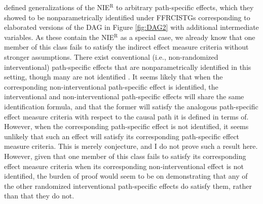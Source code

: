\documentclass[12pt]{article}
\begin{document}
\cite{lin2017interventional} defined generalizations of the NIE$^{\text{R}}$ to arbitrary path-specific effects, which they showed to be nonparametrically identified under FFRCISTGs corresponding to elaborated versions of the DAG in Figure \ref{fig:DAG2} %
with additional intermediate variables. As these contain the NIE$^{\text{R}}$ as a special case, we already know that one member of this class fails to satisfy the indirect effect measure criteria without stronger assumptions. There exist conventional (i.e., non-randomized interventional) path-specific effects that are nonparametrically identified in this setting, though many are not identified \citep{avin2005identifiability,shpitser2013counterfactual,zhou2021semiparametric}. It seems likely that when the corresponding non-interventional path-specific effect is identified, the interventional and non-interventional path-specific effects will share the same identification formula, and that the former will satisfy the analogous path-specific effect measure criteria with respect to the causal path it is defined in terms of. However, when the corresponding path-specific effect is not identified, it seems unlikely that such an effect will satisfy its corresponding path-specific effect measure criteria. This is merely conjecture, and I do not prove such a result here. 
However, given that one member of this class fails to satisfy its corresponding effect measure criteria when its corresponding non-interventional effect is not identified, the burden of proof would seem to be on demonstrating that any of the other randomized interventional path-specific effects do satisfy them, rather than that they do not.
\end{document}
